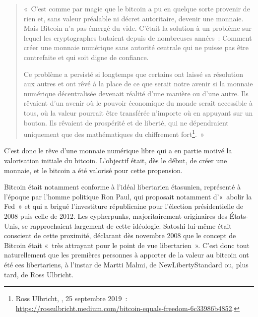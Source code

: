 \begin{quote}
«~C'est comme par magie que le bitcoin a pu en quelque sorte provenir de rien et, sans valeur préalable ni décret autoritaire, devenir une monnaie. Mais Bitcoin n'a pas émergé du vide. C'était la solution à un problème sur lequel les cryptographes butaient depuis de nombreuses années~: Comment créer une monnaie numérique sans autorité centrale qui ne puisse pas être contrefaite et qui soit digne de confiance.

Ce problème a persisté si longtemps que certains ont laissé sa résolution aux autres et ont rêvé à la place de ce que serait notre avenir si la monnaie numérique décentralisée devenait réalité d'une manière ou d'une autre. Ils rêvaient d'un avenir où le pouvoir économique du monde serait accessible à tous, où la valeur pourrait être transférée n'importe où en appuyant sur un bouton. Ils rêvaient de prospérité et de liberté, qui ne dépendraient uniquement que des mathématiques du chiffrement fort\footnote{Ross Ulbricht, , 25 septembre 2019~: \url{https://rossulbricht.medium.com/bitcoin-equals-freedom-6c33986b4852}.}.~»
\end{quote}

C'est donc le rêve d'une monnaie numérique libre qui a en partie motivé la valorisation initiale du bitcoin. L'objectif était, dès le début, de créer une monnaie, et le bitcoin a été valorisé pour cette propension. 

\clearpage
Bitcoin était notamment conforme à l'idéal libertarien étasunien, représenté à l'époque par l'homme politique Ron Paul, qui proposait notamment d'«~abolir la Fed~» et qui a brigué l'investiture républicaine pour l'élection présidentielle de 2008 puis celle de 2012. Les cypherpunks, majoritairement originaires des États-Unis, se rapprochaient largement de cette idéologie. Satoshi lui-même était conscient de cette proximité, déclarant dès novembre 2008 que le concept de Bitcoin était «~très attrayant pour le point de vue libertarien~». C'est donc tout naturellement que les premières personnes à apporter de la valeur au bitcoin ont été ces libertariens, à l'instar de Martti Malmi, de NewLibertyStandard ou, plus tard, de Ross Ulbricht.

